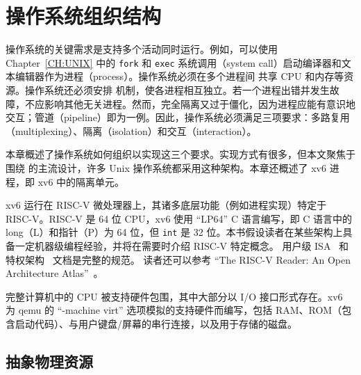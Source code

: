 
\chapter{操作系统组织结构}
\label{CH:FIRST}

操作系统的关键需求是支持多个活动同时运行。例如，可以使用 Chapter~\ref{CH:UNIX} 中的 {\tt fork} 和 {\tt exec} 系统调用（system call）启动编译器和文本编辑器作为进程（process）。操作系统必须在多个进程间  共享 CPU 和内存等资源。操作系统还必须安排  机制，使各进程相互独立。若一个进程出错并发生故障，不应影响其他无关进程。然而，完全隔离又过于僵化，因为进程应能有意识地交互；管道（pipeline）即为一例。因此，操作系统必须满足三项要求：多路复用（multiplexing）、隔离（isolation）和交互（interaction）。

本章概述了操作系统如何组织以实现这三个要求。实现方式有很多，但本文聚焦于围绕
的主流设计，许多 Unix 操作系统都采用这种架构。本章还概述了 xv6 进程，即 xv6 中的隔离单元。

xv6 运行在  RISC-V 微处理器上，其诸多底层功能（例如进程实现）特定于 RISC-V。RISC-V 是 64 位 CPU，xv6 使用 ``LP64'' C 语言编写，即 C 语言中的 long（L）和指针（P）为 64 位，但 {\tt int} 是 32 位。本书假设读者在某些架构上具备一定机器级编程经验，并将在需要时介绍 RISC-V 特定概念。
用户级 ISA~\cite{riscv:user} 和特权架构~\cite{riscv:priv} 文档是完整的规范。
读者还可以参考
``The RISC-V Reader: An Open Architecture
Atlas''~\cite{riscv}。

完整计算机中的 CPU 被支持硬件包围，其中大部分以 I/O 接口形式存在。xv6 为 qemu 的 ``-machine virt'' 选项模拟的支持硬件而编写，包括 RAM、ROM（包含启动代码）、与用户键盘/屏幕的串行连接，以及用于存储的磁盘。

\section{抽象物理资源}

